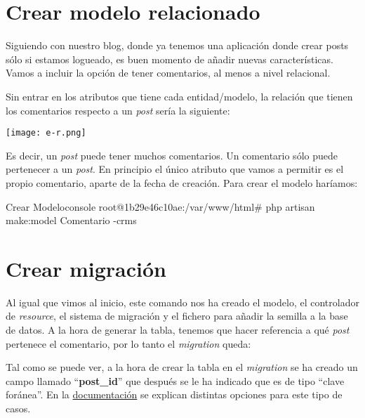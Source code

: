 \chapter{Crear modelo relacionado}

Siguiendo con nuestro blog, donde ya tenemos una aplicación donde crear posts sólo si estamos logueado, es buen momento de añadir nuevas características. Vamos a incluir la opción de tener comentarios, al menos a nivel relacional.

Sin entrar en los atributos que tiene cada entidad/modelo, la relación que tienen los comentarios respecto a un \textit{post} sería la siguiente:

\begin{center}
    \texttt{[image: e-r.png]}
\end{center}

Es decir, un \textit{post} puede tener muchos comentarios. Un comentario sólo puede pertenecer a un \textit{post}. En principio el único atributo que vamos a permitir es el propio comentario, aparte de la fecha de creación. Para crear el modelo haríamos:

\begin{mycode}{Crear Modelo}{console}{{\small }}
root@1b29e46c10ae:/var/www/html# php artisan make:model Comentario -crms
\end{mycode}


\chapter{Crear migración}
Al igual que vimos al inicio, este comando nos ha creado el modelo, el controlador de \textit{resource}, el sistema de migración y el fichero para añadir la semilla a la base de datos. A la hora de generar la tabla, tenemos que hacer referencia a qué \textit{post} pertenece el comentario, por lo tanto el \textit{migration} queda:


Tal como se puede ver, a la hora de crear la tabla en el \textit{migration} se ha creado un campo llamado “\textbf{post\_id}” que después se le ha indicado que es de tipo “clave foránea”. En la \href{https://laravel.com/docs/10.x/migrations#foreign-key-constraints}{documentación} se explican distintas opciones para este tipo de casos.

